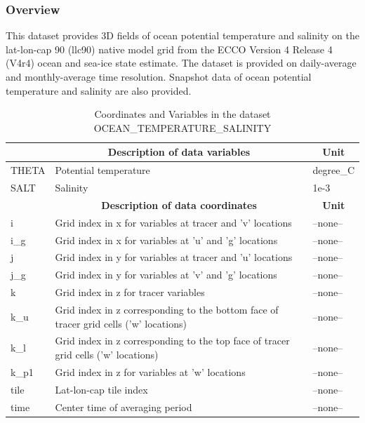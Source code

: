 \subsubsection{Overview}
This dataset provides 3D fields of ocean potential temperature and salinity on the lat-lon-cap 90 (llc90) native model grid from the ECCO Version 4 Release 4 (V4r4) ocean and sea-ice state estimate. The dataset is provided on daily-average and monthly-average time resolution. Snapshot data of ocean potential temperature and salinity are also provided. 
\begin{longtable}{|m{}|m{}|m{}|}
\caption{Coordinates and Variables in the dataset OCEAN\_TEMPERATURE\_SALINITY}
\label{tab:table-OCEAN_TEMPERATURE_SALINITY-fields} \\ 
\hline \endhead \hline \endfoot
\rowcolor{lightgray} \multicolumn{1}{|c|}{\textbf{Variables}} & \multicolumn{1}{|c|}{\textbf{Description of data variables}} &  \multicolumn{1}{|c|}{\textbf{Unit}}\\ \hline
THETA &Potential temperature  &degree\_C  \\ \hline
SALT &Salinity &1e-3  \\ \hline
\rowcolor{lightgray} \multicolumn{1}{|c|}{\textbf{Coordinates}} & \multicolumn{1}{|c|}{\textbf{Description of data coordinates}} &  \multicolumn{1}{|c|}{\textbf{Unit}}\\ \hline
i &Grid index in x for variables at tracer and 'v' locations &--none--  \\ \hline
i\_g &Grid index in x for variables at 'u' and 'g' locations &--none--  \\ \hline
j &Grid index in y for variables at tracer and 'u' locations &--none--  \\ \hline
j\_g &Grid index in y for variables at 'v' and 'g' locations &--none--  \\ \hline
k &Grid index in z for tracer variables &--none--  \\ \hline
k\_u &Grid index in z corresponding to the bottom face of tracer grid cells ('w' locations) &--none--  \\ \hline
k\_l &Grid index in z corresponding to the top face of tracer grid cells ('w' locations) &--none--  \\ \hline
k\_p1 &Grid index in z for variables at 'w' locations &--none--  \\ \hline
tile &Lat-lon-cap tile index &--none--  \\ \hline
time &Center time of averaging period &--none--  \\ \hline

\end{longtable}

